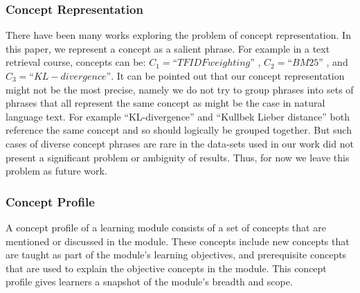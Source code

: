 \subsubsection{Concept Representation}
There have been many works exploring the problem of concept representation. 
In this paper, we represent a concept as a salient phrase. For example in a text retrieval course, concepts can be: $C_{1} = “TFIDF weighting”$ , $C_{2} = “BM25”$ , and $C_{3}=“KL-divergence”$. It can be pointed out that our concept representation might not be the most precise, namely we do not try to group phrases into sets of phrases that all represent the same concept as might be the case in natural language text. For example “KL-divergence” and “Kullbek Lieber distance” both reference the same concept and so should logically be grouped together. But such cases of diverse concept phrases are rare in the data-sets used in our work did not present a significant problem or ambiguity
of results. Thus, for now we leave this problem as future work.
\subsubsection{Concept Profile}
A concept profile of a learning module consists of a set of concepts that are mentioned or discussed in the module. These concepts include new concepts that are taught as part of the module’s learning objectives, and prerequisite concepts that are used to explain the objective concepts in the module. This concept profile gives learners a snapshot of the module’s breadth and scope. 

